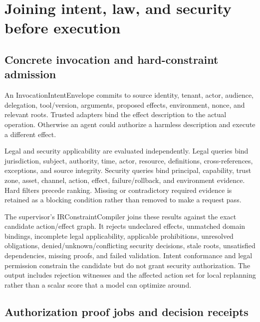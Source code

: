 \documentclass{article}
\begin{document}
\section{Joining intent, law, and security before execution}

\subsection{Concrete invocation and hard-constraint admission}

An InvocationIntentEnvelope commits to source identity, tenant, actor, audience, delegation, tool/version, arguments, proposed effects, environment, nonce, and relevant roots. Trusted adapters bind the effect description to the actual operation. Otherwise an agent could authorize a harmless description and execute a different effect.

Legal and security applicability are evaluated independently. Legal queries bind jurisdiction, subject, authority, time, actor, resource, definitions, cross-references, exceptions, and source integrity. Security queries bind principal, capability, trust zone, asset, channel, action, effect, failure/rollback, and environment evidence. Hard filters precede ranking. Missing or contradictory required evidence is retained as a blocking condition rather than removed to make a request pass.

The supervisor's IRConstraintCompiler joins these results against the exact candidate action/effect graph. It rejects undeclared effects, unmatched domain bindings, incomplete legal applicability, applicable prohibitions, unresolved obligations, denied/unknown/conflicting security decisions, stale roots, unsatisfied dependencies, missing proofs, and failed validation. Intent conformance and legal permission constrain the candidate but do not grant security authorization. The output includes rejection witnesses and the affected action set for local replanning rather than a scalar score that a model can optimize around.

\subsection{Authorization proof jobs and decision receipts}
\end{document}
